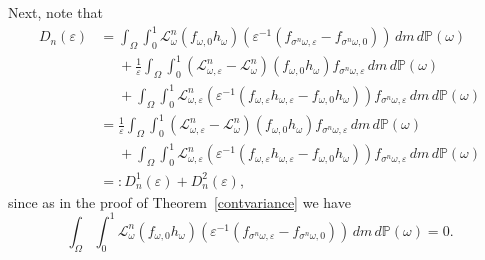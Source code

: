 \documentclass[12pt,reqno,a4paper]{article}
\begin{document}
Next,  note that 
\begin{equation}\label{w22}
	\begin{split}
		D_n(\varepsilon)
		&=\int_\Omega \int_0^1 \mathcal L_\omega^n(f_{\omega, 0}h_\omega)(\varepsilon^{-1}(f_{\sigma^n \omega, \varepsilon}-f_{\sigma^n \omega, 0}))\, dm\, d\mathbb P(\omega)\\
		&\phantom{=}+\frac{1}{\varepsilon}\int_\Omega \int_0^1 (\mathcal L_{\omega, \varepsilon}^n-\mathcal L_\omega^n)(f_{\omega, 0}h_\omega) f_{\sigma^n \omega, \varepsilon}\, dm\, d\mathbb P(\omega)\\
		&\phantom{=}+\int_\Omega \int_0^1 \mathcal L_{\omega, \varepsilon}^n(\varepsilon^{-1}(f_{\omega, \varepsilon}h_{\omega, \varepsilon}-f_{\omega, 0}h_\omega)) f_{\sigma^n \omega, \varepsilon}\, dm\, d\mathbb P(\omega)\\
		&=\frac{1}{\varepsilon}\int_\Omega \int_0^1 (\mathcal L_{\omega, \varepsilon}^n-\mathcal L_\omega^n)(f_{\omega, 0}h_\omega) f_{\sigma^n \omega, \varepsilon}\, dm\, d\mathbb P(\omega)\\
		&\phantom{=}+\int_\Omega \int_0^1 \mathcal L_{\omega, \varepsilon}^n(\varepsilon^{-1}(f_{\omega, \varepsilon}h_{\omega, \varepsilon}-f_{\omega, 0}h_\omega)) f_{\sigma^n \omega, \varepsilon}\, dm\, d\mathbb P(\omega)\\
		&=:D_n^1(\varepsilon)+D_n^2(\varepsilon),
	\end{split}
\end{equation}
since as in the proof of Theorem~\ref{contvariance} we have 
\[
\int_\Omega \int_0^1 \mathcal L_\omega^n(f_{\omega, 0}h_\omega)(\varepsilon^{-1}(f_{\sigma^n \omega, \varepsilon}-f_{\sigma^n \omega, 0}))\, dm\, d\mathbb P(\omega)=0.
\]
\end{document}

